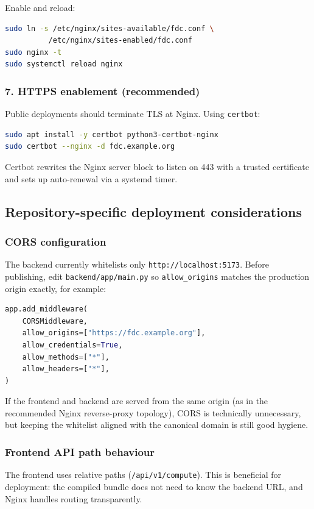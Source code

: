 \documentclass[11pt,a4paper]{article}
\begin{document}
Enable and reload:

\begin{lstlisting}[language=bash]
sudo ln -s /etc/nginx/sites-available/fdc.conf \
          /etc/nginx/sites-enabled/fdc.conf
sudo nginx -t
sudo systemctl reload nginx
\end{lstlisting}

\subsubsection{7. HTTPS enablement (recommended)}

Public deployments should terminate TLS at Nginx. Using
\texttt{certbot}:

\begin{lstlisting}[language=bash]
sudo apt install -y certbot python3-certbot-nginx
sudo certbot --nginx -d fdc.example.org
\end{lstlisting}

Certbot rewrites the Nginx server block to listen on 443 with a trusted
certificate and sets up auto-renewal via a systemd timer.

\subsection{Repository-specific deployment considerations}
\label{subsec:repo_specific_deployment_considerations}

\subsubsection{CORS configuration}
The backend currently whitelists only \texttt{http://localhost:5173}. Before
publishing, edit \texttt{backend/app/main.py} so \texttt{allow\_origins}
matches the production origin exactly, for example:

\begin{lstlisting}[language=Python]
app.add_middleware(
    CORSMiddleware,
    allow_origins=["https://fdc.example.org"],
    allow_credentials=True,
    allow_methods=["*"],
    allow_headers=["*"],
)
\end{lstlisting}

If the frontend and backend are served from the same origin (as in the
recommended Nginx reverse-proxy topology), CORS is technically unnecessary,
but keeping the whitelist aligned with the canonical domain is still good
hygiene.

\subsubsection{Frontend API path behaviour}
The frontend uses relative paths (\texttt{/api/v1/compute}). This is
beneficial for deployment: the compiled bundle does not need to know the
backend URL, and Nginx handles routing transparently.
\end{document}
